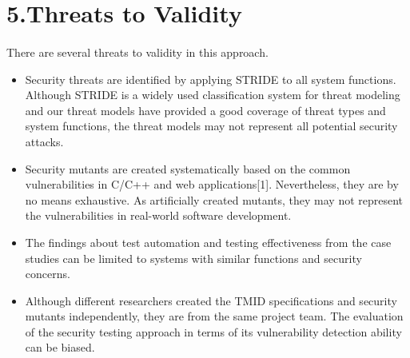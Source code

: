 \section*{\textbf{\Large 5.Threats to Validity}}
\paragraph*{}
There are several threats to validity in this approach.
\begin{itemize}
\item Security threats are identified by applying STRIDE to all
system functions. Although STRIDE is a widely used
classification system for threat modeling and our threat
models have provided a good coverage of threat types and
system functions, the threat models may not represent all
potential security attacks. 
\item Security mutants are created systematically based on the common vulnerabilities in C/C++ and web applications[1]. Nevertheless, they are by
no means exhaustive. As artificially created mutants, they
may not represent the vulnerabilities in real-world software
development. 
\item The findings about test automation
and testing effectiveness from the case studies can be
limited to systems with similar functions and security
concerns.
\item Although different researchers created the
TMID specifications and security mutants independently,
they are from the same project team. The evaluation of the
security testing approach in terms of its vulnerability
detection ability can be biased.
\end{itemize}